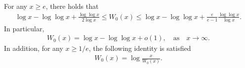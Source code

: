 %
\begin{lemma}\label{lambert}
For any $x\geq e$, there holds that
\begin{align}\label{lambert_bounds}
    \log x - \log\log x + \frac{\log \log x}{2\log x}\leq W_0(x) \leq \log x - \log\log x + \frac{e}{e-1}\frac{\log \log x}{\log x}.
\end{align}
In particular,
\begin{align}\label{lambert_asymptotics}
    W_0(x) = \log x - \log \log x + o(1), \quad \text{as} \quad x \rightarrow \infty.
\end{align}
In addition, for any $x \geq 1/e$, the following identity is satisfied
\begin{align}\label{lambert_variational}
    W_0(x) = \log \frac{x}{W_0(x)}.
\end{align}
\end{lemma}
%

